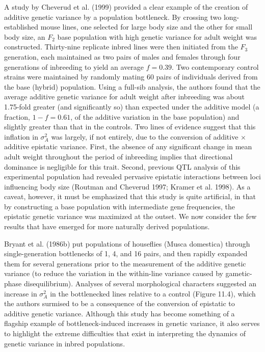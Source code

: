\documentclass{article}
\begin{document}
A study by Cheverud et al. (1999) provided a clear example of the creation of additive genetic variance by a population bottleneck. By crossing two long-established mouse lines, one selected for large body size and the other for small body size, an  $ F_2 $ base population with high genetic variance for adult weight was constructed. Thirty-nine replicate inbred lines were then initiated from the  $ F_3 $ generation, each maintained as two pairs of males and females through four generations of inbreeding to yield an average  $ f = 0.39 $. Two contemporary control strains were maintained by randomly mating 60 pairs of individuals derived from the base (hybrid) population. Using a full-sib analysis, the authors found that the average additive genetic variance for adult weight after inbreeding was about 1.75-fold greater (and significantly so) than expected under the additive model (a fraction,  $ 1 - f = 0.61 $, of the additive variation in the base population) and slightly greater than that in the controls. Two lines of evidence suggest that this inflation in  $ \sigma_A^2 $ was largely, if not entirely, due to the conversion of additive × additive epistatic variance. First, the absence of any significant change in mean adult weight throughout the period of inbreeding implies that directional dominance is negligible for this trait. Second, previous QTL analysis of this experimental population had revealed pervasive epistatic interactions between loci influencing body size (Routman and Cheverud 1997; Kramer et al. 1998). As a caveat, however, it must be emphasized that this study is quite artificial, in that by constructing a base population with intermediate gene frequencies, the epistatic genetic variance was maximized at the outset. We now consider the few results that have emerged for more naturally derived populations.

Bryant et al. (1986b) put populations of houseflies (Musca domestica) through single-generation bottlenecks of 1, 4, and 16 pairs, and then rapidly expanded them for several generations prior to the measurement of the additive genetic variance (to reduce the variation in the within-line variance caused by gametic-phase disequilibrium). Analyses of several morphological characters suggested an increase in  $ \sigma_{A}^{2} $ in the bottlenecked lines relative to a control (Figure 11.4), which the authors surmised to be a consequence of the conversion of epistatic to additive genetic variance. Although this study has become something of a flagship example of bottleneck-induced increases in genetic variance, it also serves to highlight the extreme difficulties that exist in interpreting the dynamics of genetic variance in inbred populations.
\end{document}
